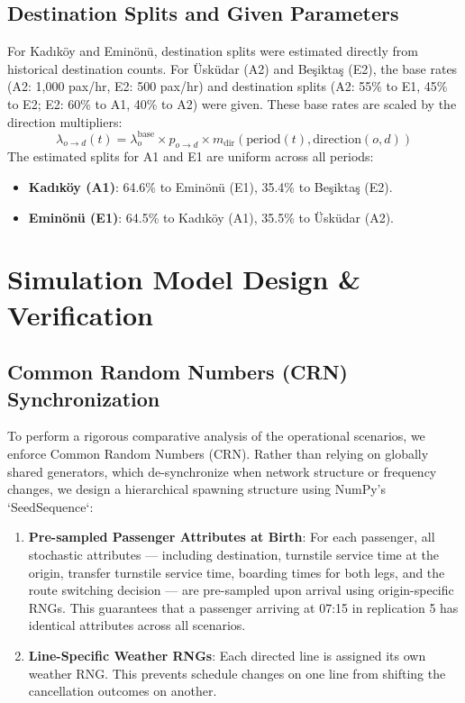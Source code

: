 \documentclass[11pt,a4paper]{article}
\begin{document}
\subsection{Destination Splits and Given Parameters}
For Kad\i k\"{o}y and Emin\"{o}n\"{u}, destination splits were estimated directly from historical destination counts. For \"Usk\"{u}dar (A2) and Be\c{s}ikta\c{s} (E2), the base rates (A2: 1,000 pax/hr, E2: 500 pax/hr) and destination splits (A2: 55\% to E1, 45\% to E2; E2: 60\% to A1, 40\% to A2) were given. These base rates are scaled by the direction multipliers:
\begin{equation}
    \lambda_{o \to d}(t) = \lambda_o^{\text{base}} \times p_{o \to d} \times m_{\text{dir}}(\text{period}(t), \text{direction}(o, d))
\end{equation}
The estimated splits for A1 and E1 are uniform across all periods:
\begin{itemize}
    \item \textbf{Kad\i k\"{o}y (A1)}: 64.6\% to Emin\"{o}n\"{u} (E1), 35.4\% to Be\c{s}ikta\c{s} (E2).
    \item \textbf{Emin\"{o}n\"{u} (E1)}: 64.5\% to Kad\i k\"{o}y (A1), 35.5\% to \"Usk\"{u}dar (A2).
\end{itemize}

\section{Simulation Model Design \& Verification}

\subsection{Common Random Numbers (CRN) Synchronization}
To perform a rigorous comparative analysis of the operational scenarios, we enforce Common Random Numbers (CRN). Rather than relying on globally shared generators, which de-synchronize when network structure or frequency changes, we design a hierarchical spawning structure using NumPy's `SeedSequence`:
\begin{enumerate}
    \item \textbf{Pre-sampled Passenger Attributes at Birth}: For each passenger, all stochastic attributes --- including destination, turnstile service time at the origin, transfer turnstile service time, boarding times for both legs, and the route switching decision --- are pre-sampled upon arrival using origin-specific RNGs. This guarantees that a passenger arriving at 07:15 in replication 5 has identical attributes across all scenarios.
    \item \textbf{Line-Specific Weather RNGs}: Each directed line is assigned its own weather RNG. This prevents schedule changes on one line from shifting the cancellation outcomes on another.
\end{enumerate}
\end{document}

